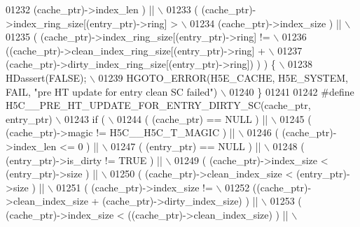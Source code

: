 \begin{DoxyCode}
01232 \textcolor{preprocessor}{      (cache\_ptr)->index\_len ) ||                                             \(\backslash\)}
01233 \textcolor{preprocessor}{    ( (cache\_ptr)->index\_ring\_size[(entry\_ptr)->ring] >                       \(\backslash\)}
01234 \textcolor{preprocessor}{      (cache\_ptr)->index\_size ) ||                                            \(\backslash\)}
01235 \textcolor{preprocessor}{    ( (cache\_ptr)->index\_ring\_size[(entry\_ptr)->ring] !=                      \(\backslash\)}
01236 \textcolor{preprocessor}{      ((cache\_ptr)->clean\_index\_ring\_size[(entry\_ptr)->ring] +                \(\backslash\)}
01237 \textcolor{preprocessor}{       (cache\_ptr)->dirty\_index\_ring\_size[(entry\_ptr)->ring]) ) ) \{           \(\backslash\)}
01238 \textcolor{preprocessor}{    HDassert(FALSE);                                                          \(\backslash\)}
01239 \textcolor{preprocessor}{    HGOTO\_ERROR(H5E\_CACHE, H5E\_SYSTEM, FAIL, "pre HT update for entry clean SC failed") \(\backslash\)}
01240 \textcolor{preprocessor}{\}}
01241 
01242 \textcolor{preprocessor}{#define H5C\_\_PRE\_HT\_UPDATE\_FOR\_ENTRY\_DIRTY\_SC(cache\_ptr, entry\_ptr)           \(\backslash\)}
01243 \textcolor{preprocessor}{if (                                                                          \(\backslash\)}
01244 \textcolor{preprocessor}{    ( (cache\_ptr) == NULL ) ||                                                \(\backslash\)}
01245 \textcolor{preprocessor}{    ( (cache\_ptr)->magic != H5C\_\_H5C\_T\_MAGIC ) ||                             \(\backslash\)}
01246 \textcolor{preprocessor}{    ( (cache\_ptr)->index\_len <= 0 ) ||                                        \(\backslash\)}
01247 \textcolor{preprocessor}{    ( (entry\_ptr) == NULL ) ||                                                \(\backslash\)}
01248 \textcolor{preprocessor}{    ( (entry\_ptr)->is\_dirty != TRUE ) ||                                      \(\backslash\)}
01249 \textcolor{preprocessor}{    ( (cache\_ptr)->index\_size < (entry\_ptr)->size ) ||                        \(\backslash\)}
01250 \textcolor{preprocessor}{    ( (cache\_ptr)->clean\_index\_size < (entry\_ptr)->size ) ||                  \(\backslash\)}
01251 \textcolor{preprocessor}{    ( (cache\_ptr)->index\_size !=                                              \(\backslash\)}
01252 \textcolor{preprocessor}{       ((cache\_ptr)->clean\_index\_size + (cache\_ptr)->dirty\_index\_size) ) ||   \(\backslash\)}
01253 \textcolor{preprocessor}{    ( (cache\_ptr)->index\_size < ((cache\_ptr)->clean\_index\_size) ) ||          \(\backslash\)}

\end{DoxyCode}
